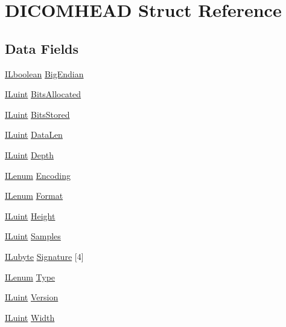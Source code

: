 \hypertarget{struct_d_i_c_o_m_h_e_a_d}{\section{D\-I\-C\-O\-M\-H\-E\-A\-D Struct Reference}
\label{struct_d_i_c_o_m_h_e_a_d}
}
\subsection*{Data Fields}
\begin{DoxyCompactItemize}
\item 
\hyperlink{il_8h_a8be80d75c2c636b9f2250fe10c2e7874}{I\-Lboolean} \hyperlink{struct_d_i_c_o_m_h_e_a_d_ab37d35577c2680f4f3d525036ab93155}{Big\-Endian}
\item 
\hyperlink{il_8h_ac6508d0e9c19e32f32e00d54b5b8cf30}{I\-Luint} \hyperlink{struct_d_i_c_o_m_h_e_a_d_a45f36b87335017f80a6ba90aedc1f8ad}{Bits\-Allocated}
\item 
\hyperlink{il_8h_ac6508d0e9c19e32f32e00d54b5b8cf30}{I\-Luint} \hyperlink{struct_d_i_c_o_m_h_e_a_d_a6b2e29dc075d368886a36f7edfad53a4}{Bits\-Stored}
\item 
\hyperlink{il_8h_ac6508d0e9c19e32f32e00d54b5b8cf30}{I\-Luint} \hyperlink{struct_d_i_c_o_m_h_e_a_d_a285225af106e127c68ac1cef9e684821}{Data\-Len}
\item 
\hyperlink{il_8h_ac6508d0e9c19e32f32e00d54b5b8cf30}{I\-Luint} \hyperlink{struct_d_i_c_o_m_h_e_a_d_a2a4c47a9713bee335a0830b336bdc951}{Depth}
\item 
\hyperlink{il_8h_a1542f3a70c0c5370a30a1fa5ce349e2d}{I\-Lenum} \hyperlink{struct_d_i_c_o_m_h_e_a_d_ac53e79bb53ac50fb000a2c68cb640daa}{Encoding}
\item 
\hyperlink{il_8h_a1542f3a70c0c5370a30a1fa5ce349e2d}{I\-Lenum} \hyperlink{struct_d_i_c_o_m_h_e_a_d_aab6d023e52ab2d90be412df75a42abfb}{Format}
\item 
\hyperlink{il_8h_ac6508d0e9c19e32f32e00d54b5b8cf30}{I\-Luint} \hyperlink{struct_d_i_c_o_m_h_e_a_d_a8a8093d76b61a95fc96df24af29b107a}{Height}
\item 
\hyperlink{il_8h_ac6508d0e9c19e32f32e00d54b5b8cf30}{I\-Luint} \hyperlink{struct_d_i_c_o_m_h_e_a_d_ae5a57de3baf26723b2a249a9e102f2f4}{Samples}
\item 
\hyperlink{il_8h_a8d2f04500100a86d1b00e98ab1b15a33}{I\-Lubyte} \hyperlink{struct_d_i_c_o_m_h_e_a_d_a5bac2a1102eda8a6453823b7be892818}{Signature} \mbox{[}4\mbox{]}
\item 
\hyperlink{il_8h_a1542f3a70c0c5370a30a1fa5ce349e2d}{I\-Lenum} \hyperlink{struct_d_i_c_o_m_h_e_a_d_a437e4fc3b579e2e7879dedd0fd2ac587}{Type}
\item 
\hyperlink{il_8h_ac6508d0e9c19e32f32e00d54b5b8cf30}{I\-Luint} \hyperlink{struct_d_i_c_o_m_h_e_a_d_ace8731875025335038f754ff027b835a}{Version}
\item 
\hyperlink{il_8h_ac6508d0e9c19e32f32e00d54b5b8cf30}{I\-Luint} \hyperlink{struct_d_i_c_o_m_h_e_a_d_a4146e7b2b0b4097e0e335f9b348392bf}{Width}
\end{DoxyCompactItemize}



